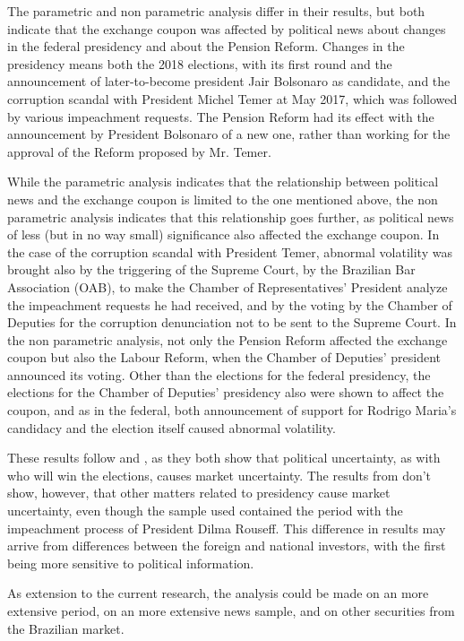 \documentclass[cic,tc, english]{iiufrgs}
\begin{document}
    The parametric and non parametric analysis differ in their results, but both indicate that the exchange coupon was affected by political news about changes in the federal presidency and about the Pension Reform. Changes in the presidency means both the 2018 elections, with its first round and the announcement of later-to-become president Jair Bolsonaro as candidate, and the corruption scandal with President Michel Temer at May 2017, which was followed by various impeachment requests. The Pension Reform had its effect with the announcement by President Bolsonaro of a new one, rather than working for the approval of the Reform proposed by Mr. Temer.

    While the parametric analysis indicates that the relationship between political news and the exchange coupon is limited to the one mentioned above, the non parametric analysis indicates that this relationship goes further, as political news of less (but in no way small) significance also affected the exchange coupon. In the case of the corruption scandal with President Temer, abnormal volatility was brought also by the triggering of the Supreme Court, by the Brazilian Bar Association (OAB), to make the Chamber of Representatives' President analyze the impeachment requests he had received, and by the voting by the Chamber of Deputies for the corruption denunciation not to be sent to the Supreme Court. In the non parametric analysis, not only the Pension Reform affected the exchange coupon but also the Labour Reform, when the Chamber of Deputies' president announced its voting. Other than the elections for the federal presidency, the elections for the Chamber of Deputies' presidency also were shown to affect the coupon, and as in the federal, both announcement of support for Rodrigo Maria's candidacy and the election itself caused abnormal volatility.

    These results follow \citet{smales2015} and \citet{marquessantos2016}, as they both show that political uncertainty, as with who will win the elections, causes market uncertainty. The results from \citet{marquessantos2016} don't show, however, that other matters related to presidency cause market uncertainty, even though the sample used contained the period with the impeachment process of President Dilma Rouseff. This difference in results may arrive from differences between the foreign and national investors, with the first being more sensitive to political information.

    As extension to the current research, the analysis could be made on an more extensive period, on an more extensive news sample, and on other securities from the Brazilian market.
\end{document}
